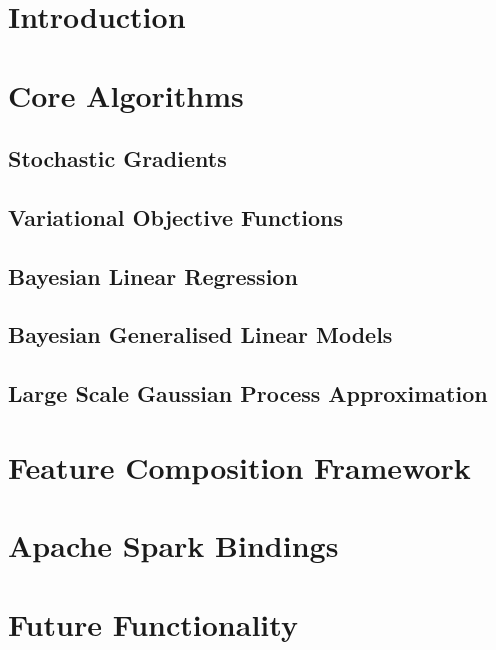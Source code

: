 \documentclass[11pt, oneside]{article}
\title{\sffamily{\emph{revrand}: Technical Report}}
\author{Daniel Steinberg, Louis Tiao, Dave Cole\\ 
    Data61 $|$ CSIRO \\
    email: \texttt{\{firstname.lastname\}@data61.csiro.au}
}
\date{}
\begin{document}
\maketitle
\vspace{-0.5cm}
\noindent\makebox[\linewidth]{\rule{\linewidth}{0.8pt}}
\vspace{0.3cm}

\begin{abstract}
    This is a technical report on the \emph{revrand} software library. This
    library implements various Bayesian linear models (Bayesian linear
    regression), approximate Gaussian processes and generalised linear models.
    These algorithms have been implemented such that they can be used for
    large-scale inference by using stochastic gradients, and are deployable on
    computational clusters with Apache Spark. All of the algorithms in
    \emph{revrand} use a unified feature composition framework, that allows for
    easy composition of positive-definite covariance functions and easy
    manipulation and combination of regression basis functions.
\end{abstract}

\tableofcontents

\section{Introduction}

\section{Core Algorithms}

\subsection{Stochastic Gradients}

\subsection{Variational Objective Functions}

\subsection{Bayesian Linear Regression}

\subsection{Bayesian Generalised Linear Models}

\subsection{Large Scale Gaussian Process Approximation}

\section{Feature Composition Framework}

\section{Apache Spark Bindings}

\section{Future Functionality}
\end{document}
